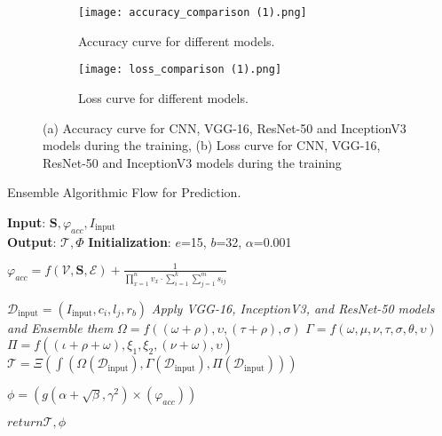 \documentclass[10pt, conference, a4paper, compsocconf]{IEEEtran}
\begin{document}
\begin{figure*}[h!]
	\centering
 \begin{subfigure}[b]{0.45\textwidth}
		\centering
		\texttt{[image: accuracy\_comparison (1).png]}
		\caption{Accuracy curve for different models.}
		\label{fig:3(a)}
	\end{subfigure}
	\begin{subfigure}[b]{0.45\textwidth}
		\centering
		\texttt{[image: loss\_comparison (1).png]}    
		\caption{Loss curve for different models.}
		\label{fig:3(b)}
	\end{subfigure}
	\caption{(a) Accuracy curve for CNN, VGG-16, ResNet-50 and InceptionV3 models  during the training, (b) Loss curve for CNN, VGG-16, ResNet-50 and InceptionV3 models  during the training}
	\label{fig:3}
\end{figure*}
 
\begin{algorithm}[h!]
	\caption{Ensemble Algorithmic Flow for Prediction.}
	\label{alg:ts}
	\normalsize
	\textbf{Input}: $\mathbf{S}, \varphi_{acc}, I_{\text{input}}$\\
	\textbf{Output}: $\mathcal{T}, \Phi$
         \textbf{Initialization}: $e$=15, $b$=32, $\alpha$=0.001
	\begin{algorithmic}[1]

        \State  $\varphi_{acc} = f(\mathcal{V}, \mathbf{S}, \mathcal{E}) + \frac{1}{{\prod_{x=1}^{n} v_{x} \cdot \sum_{i=1}^{k} \sum_{j=1}^{m} s_{ij}}}$
        
        \State $\mathcal{D}_{\text{input}} = (I_{\text{input}}, c_{i}, l_{j}, r_{b})$
        \State \textit{Apply VGG-16, InceptionV3, and
ResNet-50 models and Ensemble them}
        \State $\Omega = f ((\omega+\rho),\upsilon,(\tau+\rho),\sigma)$ 
        \State $\Gamma = f (\omega,\mu,\nu,\tau,\sigma,\theta,\upsilon)$
        \State $\Pi = f((\iota+\rho+\omega),\xi_{1},\xi_{2},(\nu+\omega),\upsilon)$
        \State $\mathcal{T} = \Xi (\int (\Omega(\mathcal{D}_{\text{input}}),\Gamma(\mathcal{D}_{\text{input}}),\Pi(\mathcal{D}_{\text{input}})))$

        \State   $\phi = \left(g(\alpha + \sqrt{\beta}, \gamma^{2}) \times (\varphi_{acc})\right)$
        
        \State $return  \mathcal{T}, \phi$ 
        \EndIf
	\EndProcedure
	\end{algorithmic}
\end{algorithm}
\end{document}
